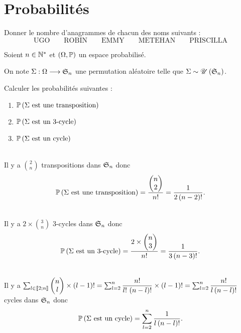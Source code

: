 \chapter{Probabilités}

\minitoc

\begin{exo}[Exercice 1]
Donner le nombre d'anagrammes de chacun des noms suivants : \[\text{UGO}\qquad\text{ROBIN}\qquad\text{EMMY}\qquad\text{METEHAN}\qquad\text{PRISCILLA}\]
\end{exo}

\begin{corr}
\end{corr}

\begin{exo}[Exercice 2]
Soient \(n\in\Ns\) et \(\groupe{\Omega}[\prem]\) un espace probabilisé.

On note \(\Sigma:\Omega\to\S{n}\) une permutation aléatoire telle que \(\Sigma\sim\loiuniforme{\S{n}}\).

Calculer les probabilités suivantes :

\begin{enumerate}
    \item \(\proba{\Sigma\text{ est une transposition}}\) \\
    \item \(\proba{\Sigma\text{ est un 3-cycle}}\) \\
    \item \(\proba{\Sigma\text{ est un cycle}}\)
\end{enumerate}
\end{exo}

\begin{corr}[1]~\\
Il y a \(\binom{2}{n}\) transpositions dans \(\S{n}\) donc \[\proba{\Sigma\text{ est une transposition}}=\dfrac{\binom{2}{n}}{n!}=\dfrac{1}{2\paren{n-2}!}.\]
\end{corr}

\begin{corr}[2]~\\
Il y a \(2\times\binom{3}{n}\) \(3\)-cycles dans \(\S{n}\) donc \[\proba{\Sigma\text{ est un 3-cycle}}=\dfrac{2\times\binom{3}{n}}{n!}=\dfrac{1}{3\paren{n-3}!}.\]
\end{corr}

\begin{corr}[3]~\\
Il y a \(\sum_{l\in\interventierii{2}{n}}\binom{l}{n}\times\paren{l-1}!=\sum_{l=2}^n\dfrac{n!}{l!\,\paren{n-l}!}\times\paren{l-1}!=\sum_{l=2}^n\dfrac{n!}{l\paren{n-l}!}\) cycles dans \(\S{n}\) donc \[\proba{\Sigma\text{ est un cycle}}=\sum_{l=2}^n\dfrac{1}{l\paren{n-l}!}.\]
\end{corr}

